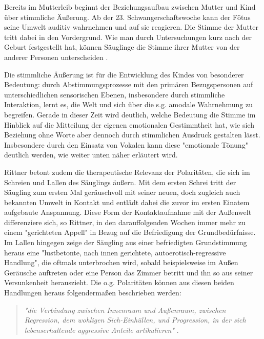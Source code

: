 Bereits im Mutterleib beginnt der Beziehungsaufbau zwischen Mutter und Kind über stimmliche Äußerung. Ab der 23. Schwangerschaftswoche kann der Fötus seine Umwelt auditiv wahrnehmen und auf sie reagieren. Die Stimme der Mutter tritt dabei in den Vordergrund. Wie man durch Untersuchungen kurz nach der Geburt festgestellt hat, können Säuglinge die Stimme ihrer Mutter von der anderer Personen unterscheiden \autocite [vgl.][22f]{noecker-ribeaupierre2004}. 

Die stimmliche Äußerung ist für die Entwicklung des Kindes von besonderer Bedeutung: durch Abstimmungsprozesse mit den primären Bezugspersonen auf unterschiedlichen sensorischen Ebenen, insbesondere durch stimmliche Interaktion, lernt es, die Welt und sich über die s.g. amodale Wahrnehmung zu begreifen. Gerade in dieser Zeit wird deutlich, welche Bedeutung die Stimme im Hinblick auf die Mitteilung der eigenen emotionalen Gestimmtheit hat, wie sich Beziehung ohne Worte aber dennoch durch stimmlichen Ausdruck gestalten lässt. Insbesondere durch den Einsatz von Vokalen kann diese "emotionale Tönung" \autocite[205]{rittner2008} deutlich werden, wie weiter unten näher erläutert wird.

Rittner \autocite [vgl.][106f.]{rittner1990} betont zudem die therapeutische Relevanz der Polaritäten, die sich im Schreien und Lallen des Säuglings äußern. Mit dem ersten Schrei tritt der Säugling zum ersten Mal geräuschvoll mit seiner neuen, doch zugleich auch bekannten Umwelt in Kontakt und entlädt dabei die zuvor im ersten Einatem aufgebaute Anspannung. Diese Form der Kontaktaufnahme mit der Außenwelt differenziere sich, so Rittner, in den darauffolgenden Wochen immer mehr zu einem "gerichteten Appell" in Bezug auf die Befriedigung der Grundbedürfnisse. Im Lallen hingegen zeige der Säugling aus einer befriedigten Grundstimmung heraus eine "lustbetonte, nach innen gerichtete, autoerotisch-regressive Handlung", die oftmals unterbrochen wird, sobald beispielsweise im Außen Geräusche auftreten oder eine Person das Zimmer betritt und ihn so aus seiner Versunkenheit herauszieht. 
Die o.g. Polaritäten können aus diesen beiden Handlungen heraus folgendermaßen beschrieben werden: 

\begin{quote}
\emph{"die Verbindung zwischen Innenraum und Außenraum, zwischen Regression, dem wohligen Sich-Einhüllen, und Progression, in der sich lebenserhaltende aggressive Anteile artikulieren"} \autocite[106f.]{rittner1990}. 
\end{quote}


